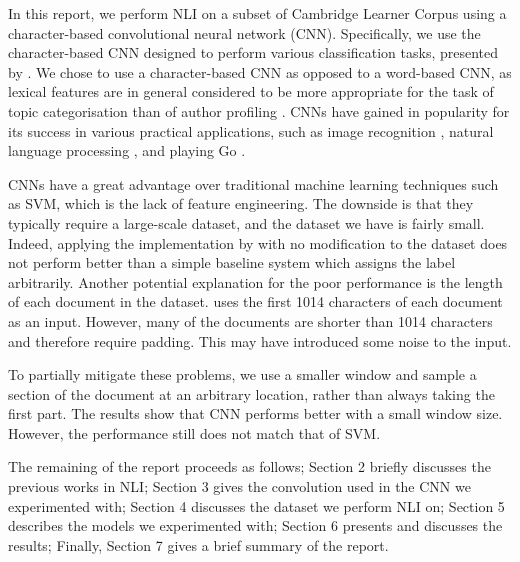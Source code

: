 In this report, we perform NLI on a subset of Cambridge Learner Corpus  \citep{nicholls2003cambridge, yannakoudakis2011new} using a character-based convolutional neural network (CNN).
Specifically, we use the character-based CNN designed to perform various classification tasks, presented by \cite{zhang2015character}.
We chose to use a character-based CNN as opposed to a word-based CNN, as lexical features are in general considered to be more appropriate for the task of topic categorisation than of author profiling  \citep{kochmar2011identification}.
CNNs have gained in popularity for its success in various practical applications, such as image recognition \citep{krizhevsky2012imagenet, simonyan2014very, he2016deep}, natural language processing \citep{jackson2007natural, collobert2011natural, kalchbrenner2014convolutional}, and playing Go \citep{silver2016mastering}.

CNNs have a great advantage over traditional machine learning techniques such as SVM, which is the lack of feature engineering.
The downside is that they typically require a large-scale dataset, and the dataset we have is fairly small.
Indeed, applying the implementation by  \cite{zhang2015character} with no modification to the dataset does not perform better than a simple baseline system which assigns the label arbitrarily.
Another potential explanation for the poor performance is the length of each document in the dataset.
\cite{zhang2015character} uses the first 1014 characters of each document as an input.
However, many of the documents are shorter than 1014 characters and therefore require padding.
This may have introduced some noise to the input.

To partially mitigate these problems, we use a smaller window and sample a section of the document at an arbitrary location, rather than always taking the first part.
The results show that CNN performs better with a small window size.
However, the performance still does not match that of SVM.

The remaining of the report proceeds as follows; Section 2 briefly discusses the previous works in NLI; Section 3 gives the convolution used in the CNN we experimented with; Section 4 discusses the dataset we perform NLI on; Section 5 describes the models we experimented with; Section 6 presents and discusses the results; Finally, Section 7 gives a brief summary of the report.